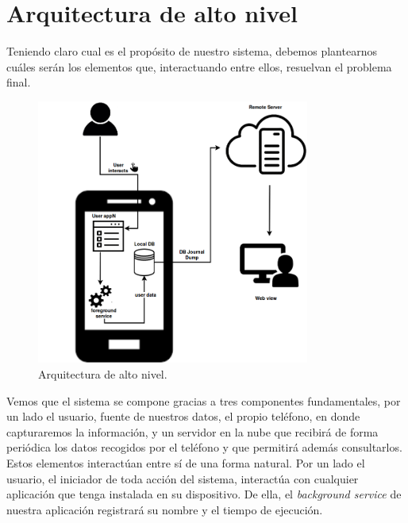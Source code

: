 \documentclass[12pt,a4paper,oneside]{book} %
\begin{document}
\section{Arquitectura de alto nivel}
Teniendo claro cual es el propósito de nuestro sistema, debemos plantearnos cuáles serán los elementos que, interactuando entre ellos, resuelvan el problema final. 

\begin{figure}[H]
  \begin{center}
     \includegraphics[width=0.8\textwidth]{pictures/architecture/highLevel/altonivel01.png}
  \end{center}
  \caption[Arquitectura de alto nivel]{Arquitectura de alto nivel.}
  \label{fig:Arquitectura de alto nivel}
\end{figure}
Vemos que el sistema se compone gracias a tres componentes fundamentales, por un lado el usuario, fuente de nuestros datos, el propio teléfono, en donde capturaremos la información, y un servidor en la nube que recibirá de forma periódica los datos recogidos por el teléfono y que permitirá además consultarlos. 
\newline \newline 
Estos elementos interactúan entre sí de una forma natural. Por un lado el usuario, el iniciador de toda acción del sistema, interactúa con cualquier aplicación que tenga instalada en su dispositivo. De ella, el \textit{background service} de nuestra aplicación registrará su nombre y el tiempo de ejecución. 
\newline \newline 
\end{document}
